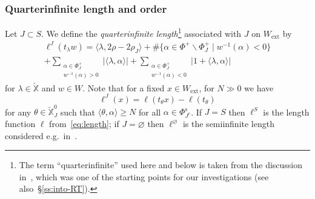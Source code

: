 \documentclass[11pt]{amsart}
\numberwithin{equation}{section}
\theoremstyle{plain}
\theoremstyle{definition}
\newcommand{\X}{{\mathbb X}}
\newcommand{\Xd}{\check{\X}}
\newcommand{\Phis}{\Phi^{\mathrm{s}}}
\newcommand{\ex}{\mathrm{ext}}
\newcommand{\comp}{\mathrm{c}}
\begin{document}
\subsubsection{Quarterinfinite length and order} 
\label{sss:quar-length}

Let $J\subset S$.
We define the \emph{quarterinfinite length}\footnote{The term ``quarterinfinite'' used here and below is taken from the discussion in~\cite[\S 8.11]{bez-losev}, which was one of the starting points for our investigations (see also~\S\ref{ss:into-RT}).} associated with $J$ on $W_\ex$ by 
\begin{multline*}
\ell^J(t_\lambda w) = \langle \lambda, 2\rho-2\rho_J \rangle 
+ \#\{ \alpha \in \Phi^+\smallsetminus \Phi^+_J \mid w^{-1}(\alpha) <0 \} \\ 
+ \sum_{\substack{\alpha \in \Phi_J^+ \\ w^{-1}(\alpha) >0}} | \langle \lambda, \alpha \rangle | 
+ \sum_{\substack{\alpha \in \Phi_J^+ \\ w^{-1}(\alpha) <0}} | 1+ \langle \lambda, \alpha \rangle |
\end{multline*}
for $\lambda \in \Xd$ and $w \in W$.
Note that for a fixed $x \in W_\ex$, for $N \gg 0$ we have
\[
\ell^J(x)=\ell(t_{\theta} x)-\ell(t_\theta)
\]
for any $\theta \in \Xd_J^0$ such that $\langle \theta,\alpha \rangle \geq N$ for all $\alpha \in \Phis_{J^\comp}$. 
If $J=S$ then $\ell^S$ is the length function $\ell$ from~\eqref{eq:length}; if $J=\varnothing$ then $\ell^{\varnothing}$ is the semiinfinite length considered e.g.~in~\cite[Remark~3.5]{adr}. 
\end{document}
